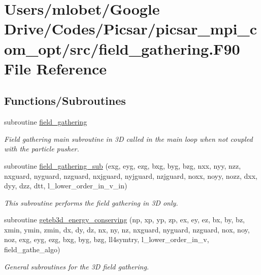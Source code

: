 \hypertarget{field__gathering_8_f90}{}\section{Users/mlobet/\+Google Drive/\+Codes/\+Picsar/picsar\+\_\+mpi\+\_\+com\+\_\+opt/src/field\+\_\+gathering.F90 File Reference}
\label{field__gathering_8_f90}
\subsection*{Functions/\+Subroutines}
\begin{DoxyCompactItemize}
\item 
subroutine \hyperlink{field__gathering_8_f90_a967586c463fd968e31a929a61e6e2b65}{field\+\_\+gathering}
\begin{DoxyCompactList}\small\item\em Field gathering main subroutine in 3D called in the main loop when not coupled with the particle pusher. \end{DoxyCompactList}\item 
subroutine \hyperlink{field__gathering_8_f90_a3048fd8eb5e48d87fa67d382d260b22f}{field\+\_\+gathering\+\_\+sub} (exg, eyg, ezg, bxg, byg, bzg, nxx, nyy, nzz, nxguard, nyguard, nzguard, nxjguard, nyjguard, nzjguard, noxx, noyy, nozz, dxx, dyy, dzz, dtt, l\+\_\+lower\+\_\+order\+\_\+in\+\_\+v\+\_\+in)
\begin{DoxyCompactList}\small\item\em This subroutine performs the field gathering in 3D only. \end{DoxyCompactList}\item 
subroutine \hyperlink{field__gathering_8_f90_a02f8f275e2b38a13c4de92719714b016}{geteb3d\+\_\+energy\+\_\+conserving} (np, xp, yp, zp, ex, ey, ez, bx, by, bz, xmin, ymin, zmin, dx, dy, dz, nx, ny, nz, nxguard, nyguard, nzguard,                                                                                                                                                       nox, noy, noz, exg, eyg, ezg, bxg, byg, bzg, ll4symtry, l\+\_\+lower\+\_\+order\+\_\+in\+\_\+v, field\+\_\+gathe\+\_\+algo)
\begin{DoxyCompactList}\small\item\em General subroutines for the 3D field gathering. \end{DoxyCompactList}\item 

\end{DoxyCompactItemize}

